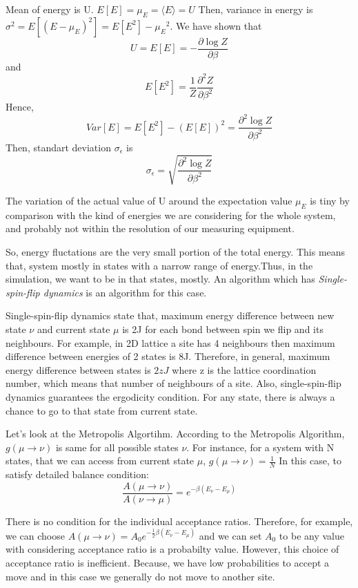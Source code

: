 \documentclass[12pt,fleqn]{report}
\begin{document}
Mean of energy is U. $E[E] = \mu_E = \langle E \rangle = U$ Then, variance in energy is $\sigma^2 = E[(E-\mu_E)^2] = E[E^2] - {\mu_E}^2$. We have shown that $$ 
U = E[E] = - \frac{\partial \log Z}{\partial \beta}
$$
and 
$$
E[E^2] = \frac{1}{Z} \frac{\partial^2 Z}{\partial \beta^2}
$$
Hence, 
\begin{equation}
Var[E] = E[E^2] - (E[E])^2 = \frac{\partial^2 \log Z}{\partial \beta^2}
\end{equation}
Then, standart deviation $\sigma_\epsilon$ is
\begin{equation}
\sigma_\epsilon = \sqrt{\frac{\partial^2 \log Z}{\partial \beta^2}}
\end{equation}

The variation of the actual value of U around the expectation value $\mu_E$ is tiny by comparison with the kind of energies we are considering for the whole system, and probably not within the resolution of our measuring equipment.\cite[p. 11]{newman}

So, energy fluctations are the very small portion of the total energy. This means that, system mostly in states with a narrow range of energy.Thus, in the simulation, we want to be in that states, mostly. An algorithm which has \textit{Single-spin-flip dynamics} is an algorithm for this case. 


Single-spin-flip dynamics state that, maximum energy difference between new state $\nu$ and current state $\mu$ is 2J for each bond between spin we flip and its neighbours.  For example, in 2D lattice a site has 4 neighbours then maximum difference between energies of 2 states is 8J.  Therefore, in general, maximum energy difference between states is $2zJ$ where z is the lattice coordination number, which means that number of neighbours of a site. Also, single-spin-flip dynamics guarantees the ergodicity condition. For any state, there is always a chance to go to that state from current state.

Let's look at the Metropolis Algortihm. According to the Metropolis Algorithm, $g(\mu \rightarrow \nu)$ is same for all possible states $\nu$. For instance, for a system with N states, that we can access from current state $\mu$, $g(\mu \rightarrow \nu) = \frac{1}{N}$
In this case, to satisfy detailed balance condition: 
\begin{equation}
\frac{A(\mu \rightarrow \nu)}{A(\nu \rightarrow \mu)} = e^{-\beta (E_\nu - E_\mu) }
\end{equation}

There is no condition for the individual acceptance ratios. Therefore, for example, we can choose $A(\mu \rightarrow \nu) = A_0 e^{ - \frac{1}{2} \beta (E_\nu - E_\mu)}$ and we can set $A_0$ to be any value with considering acceptance ratio is a probabilty value. However, this choice of acceptance ratio is inefficient. Because, we have low probabilities to accept a move and in this case we generally do not move to another site. 
\end{document}
